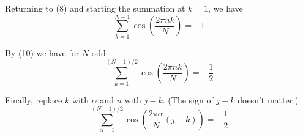 \bigskip
Returning to (8) and starting the summation at $k=1$, we have
\begin{equation*}
\sum_{k=1}^{N-1}\cos\left(\frac{2\pi nk}{N}\right)=-1
\end{equation*}

By (10) we have for $N$ odd
\begin{equation*}
\sum_{k=1}^{(N-1)/2}\cos\left(\frac{2\pi nk}{N}\right)=-\frac{1}{2}
\end{equation*}

Finally, replace $k$ with $\alpha$ and $n$ with $j-k$.
(The sign of $j-k$ doesn't matter.)
\begin{equation*}
\sum_{\alpha=1}^{(N-1)/2}\cos\left(\frac{2\pi\alpha}{N}(j-k)\right)=-\frac{1}{2}
\end{equation*}


